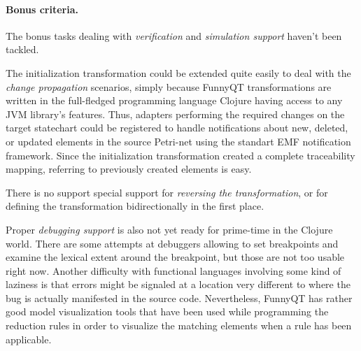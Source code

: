 \documentclass[submission]{eptcs}
\begin{document}
\paragraph{Bonus criteria.}

The bonus tasks dealing with \emph{verification} and \emph{simulation support}
haven't been tackled.

The initialization transformation could be extended quite easily to deal with
the \emph{change propagation} scenarios, simply because FunnyQT transformations
are written in the full-fledged programming language Clojure having access to
any JVM library's features.  Thus, adapters performing the required changes on
the target statechart could be registered to handle notifications about new,
deleted, or updated elements in the source Petri-net using the standart EMF
notification framework.  Since the initialization transformation created a
complete traceability mapping, referring to previously created elements is
easy.

There is no support special support for \emph{reversing the transformation}, or
for defining the transformation bidirectionally in the first place.

Proper \emph{debugging support} is also not yet ready for prime-time in the
Clojure world.  There are some attempts at debuggers allowing to set
breakpoints and examine the lexical extent around the breakpoint, but those are
not too usable right now.  Another difficulty with functional languages
involving some kind of laziness is that errors might be signaled at a location
very different to where the bug is actually manifested in the source code.
Nevertheless, FunnyQT has rather good model visualization tools that have been
used while programming the reduction rules in order to visualize the matching
elements when a rule has been applicable.





\end{document}
